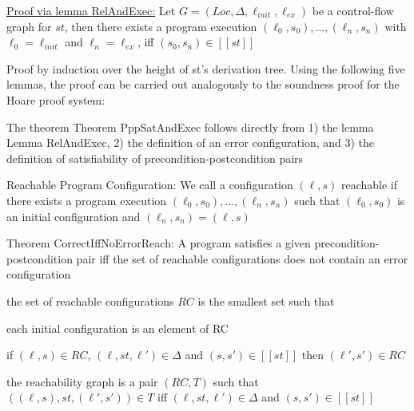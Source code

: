 \documentclass[landscape, a4paper]{article}
\begin{document}
\begin{minipage}[t]{0.2\linewidth}
\begin{betterlist}
\begin{betterlist}
			\item \underline{Proof via lemma \alert{RelAndExec}:} Let $G = (Loc, \Delta, \ell_{init}, \ell_{ex})$ be a control-flow graph for $st$, then there exists a program execution $(\ell_0, s_0), . . . , (\ell_n, s_n)$ with $\ell_0 = \ell_{init}$ and $\ell_n = \ell_{ex}$, iff $(s_0, s_n) \in [[st]]$
			\begin{betterlist}
				\item Proof by induction over the height of st’s derivation tree. Using the following five lemmas, the proof can be carried out analogously to the soundness proof for the Hoare proof system:
				\begin{betterlist}
					\item {}
					\item {}
					\item {}
					\item {}
				\end{betterlist}
			\end{betterlist}
			\item The theorem Theorem PppSatAndExec follows directly from 1) the lemma Lemma RelAndExec, 2) the definition of an error configuration, and 3) the definition of satisfiability of precondition-postcondition pairs
		\end{betterlist}
		\item \alert{Reachable Program Configuration:} We call a configuration $(\ell, s)$ \alert{reachable} if there exists a program execution $(\ell_0, s_0), . . . , (\ell_n, s_n)$ such that $(\ell_0, s_0)$ is an initial configuration and $(\ell_n, s_n) = (\ell, s)$
		\item \alert{Theorem CorrectIffNoErrorReach:} A program satisfies a given precondition-postcondition pair iff the set of reachable configurations does not contain an error configuration
		\item the \alert{set of reachable configurations $RC$} is the smallest set such that
		\begin{betterlist}
			\item each initial configuration is an element of RC
			\item if $(\ell, s) \in RC$, $(\ell, st, \ell') \in \Delta$ and $(s, s') \in [[st]]$ then $(\ell', s') \in RC$
		\end{betterlist}
		\item \color{orange}the \alert{reachability graph} is a pair $(RC, T)$ such that $((\ell, s), st, (\ell', s')) \in T$ iff $(\ell, st, \ell') \in \Delta$ and $(s, s') \in [[st]]$\color{black}

\end{betterlist}
\end{minipage}
\end{document}
